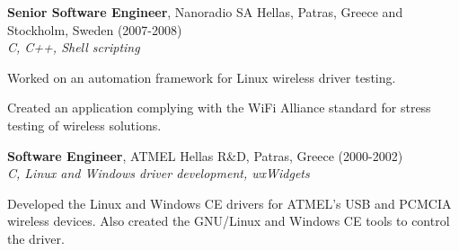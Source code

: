 \documentclass[alan.tex]{subfiles}
\begin{document}
  \item \textbf{Senior Software Engineer}, Nanoradio SA Hellas, Patras, Greece and Stockholm, Sweden (2007-2008)\\
  \emph { C, C++, Shell scripting }
    \begin{my_desc}
      \item[Worked] on an automation framework for Linux wireless driver testing.
      \item[Created] an application complying with the WiFi Alliance standard for stress testing of wireless solutions.
    \end{my_desc}
  \item \textbf{Software Engineer}, ATMEL Hellas R\&D, Patras, Greece (2000-2002)\\
    \emph{ C, Linux and Windows driver development, wxWidgets}
    \begin{my_desc}
      \item[Developed] the Linux and Windows CE drivers for ATMEL's USB and PCMCIA wireless devices. Also created the GNU/Linux and Windows CE tools to control the driver. 
    \end{my_desc}
\end{document}
